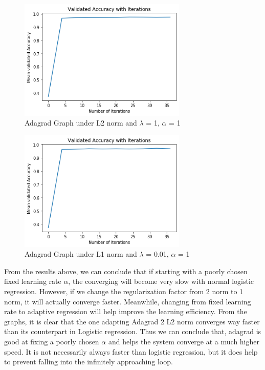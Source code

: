 \documentclass{article}
\begin{document}
		\begin{figure}[H]
			\caption{Adagrad Graph under L2 norm and $\lambda$ = 1, $\alpha$ = 1}
			\centering
			\includegraphics[width=8cm]{AdaNorm2.png}
		\end{figure}
		
		
		\begin{figure}[H]
			\caption{Adagrad Graph under L1 norm and $\lambda$ = 0.01, $\alpha$ = 1}
			\centering
			\includegraphics[width=8cm]{AdaNorm1.png}
		\end{figure}
	

From the results above, we can conclude that if starting with a poorly chosen fixed learning rate $\alpha$, the converging will become very slow with normal logistic regression. However, if we change the regularization factor from 2 norm to 1 norm, it will actually converge faster. Meanwhile, changing from fixed learning rate to adaptive regression will help improve the learning efficiency. From the graphs, it is clear that the one adapting Adagrad 2 L2 norm converges way faster than its counterpart in Logistic regression. Thus we can conclude that, adagrad is good at fixing a poorly chosen $\alpha$ and helps the system converge at a much higher speed. It is not necessarily always faster than logistic regression, but it does help to prevent falling into the infinitely approaching loop.


        
\end{document}
